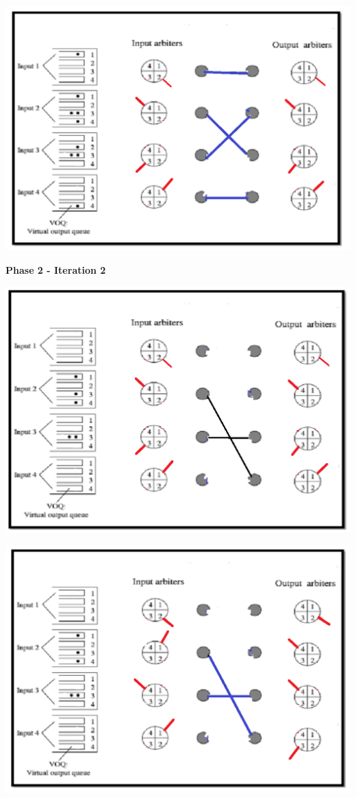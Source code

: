 \begin{qsolve}
	\begin{latin}
		
		\begin{center}
			\includegraphics*[width=0.7\linewidth]{pics/img11.png}
		\end{center}
		
		
		\textbf{Phase 2 - Iteration 2}\\
		\begin{center}
			\includegraphics*[width=0.7\linewidth]{pics/img12.png}
		\end{center}
		
	\end{latin}
\end{qsolve}
\newpage


\begin{qsolve}
	\begin{latin}
		
		\begin{center}
			\includegraphics*[width=0.7\linewidth]{pics/img13.png}
		\end{center}
	\end{latin}
\end{qsolve}
\newpage